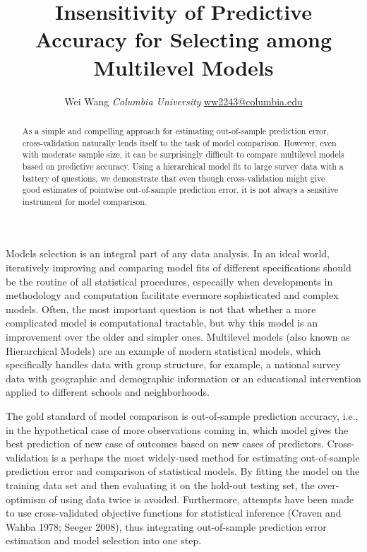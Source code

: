 \documentclass[11pt,article,oneside]{memoir}
\title{\bigskip \bigskip Insensitivity of Predictive Accuracy for Selecting among Multilevel
Models}
\author{\Large Wei Wang\vspace{0.05in} \newline\normalsize\emph{Columbia University} \newline\footnotesize \url{ww2243@columbia.edu}\vspace*{0.2in}\newline }
\date{}
\begin{document}
  
\pagestyle{kjh}


\maketitle



\begin{abstract}

\noindent As a simple and compelling approach for estimating out-of-sample
prediction error, cross-validation naturally lends itself to the task of
model comparison. However, even with moderate sample size, it can be
surprisingly difficult to compare multilevel models based on predictive
accuracy. Using a hierarchical model fit to large survey data with a
battery of questions, we demonstrate that even though cross-validation
might give good estimates of pointwise out-of-sample prediction error,
it is not always a sensitive instrument for model comparison.

\end{abstract}


Models selection is an integral part of any data analysis. In an ideal
world, iteratively improving and comparing model fits of different
specifications should be the routine of all statistical procedures,
especailly when developments in methodology and computation facilitate
evermore sophisticated and complex models. Often, the most important
question is not that whether a more complicated model is computational
tractable, but why this model is an improvement over the older and
simpler ones. Multilevel models (also known as Hierarchical Models) are
an example of modern statistical models, which specifically handles data
with group structure, for example, a national survey data with
geographic and demographic information or an educational intervention
applied to different schools and neighborhoods.

The gold standard of model comparison is out-of-sample prediction
accuracy, i.e., in the hypothetical case of more observations coming in,
which model gives the best prediction of new case of outcomes based on
new cases of predictors. Cross-validation is a perhaps the most
widely-used method for estimating out-of-sample prediction error and
comparison of statistical models. By fitting the model on the training
data set and then evaluating it on the hold-out testing set, the
over-optimism of using data twice is avoided. Furthermore, attempts have
been made to use cross-validated objective functions for statistical
inference (Craven and Wahba 1978; Seeger 2008), thus integrating
out-of-sample prediction error estimation and model selection into one
step.
\end{document}
